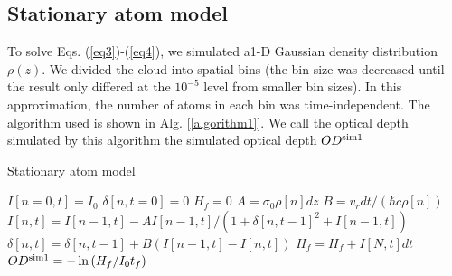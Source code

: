 \documentclass[12pt]{iopart}
\begin{document}
\subsection{Stationary atom model}
To solve Eqs. (\ref{eq3})-(\ref{eq4}), we simulated a1-D Gaussian density distribution $\rho(z)$. We divided the cloud into spatial bins (the bin size was decreased until the result only differed at the $10^{-5}$ level from smaller bin sizes).  In this approximation, the number of atoms in each bin was time-independent.  The algorithm used is shown in Alg. [\ref{algorithm1}]. We call the optical depth simulated by this algorithm the simulated optical depth $OD^{\rm{sim1}}$

\begin{algorithm}
\caption{Stationary atom model}
\label{algorithm1}
\begin{algorithmic}
\STATE $I[n=0,t]=I_0$  
\STATE $\delta[n, t=0]=0$ 
\STATE $H_f=0$ 
 \STATE $A=\sigma_0\rho[n] dz$ 
 \STATE $B=v_r dt/(\hbar c \rho[n])$  
\STATE $I[n,t]=I[n-1,t] - A I[n-1,t]/(1+\delta[n,t-1]^2+I[n-1,t])$  
\STATE $\delta[n,t]=\delta[n,t-1]+B\left(I[n-1,t]-I[n,t]\right)$   
\ENDFOR 
\STATE $H_f =H_f+ I[N,t]dt$ 
\ENDFOR
\STATE $OD^{\rm{sim1}}=-\ln{(H_f/I_0t_f)}$
\end{algorithmic}
\end{algorithm}
\end{document}
